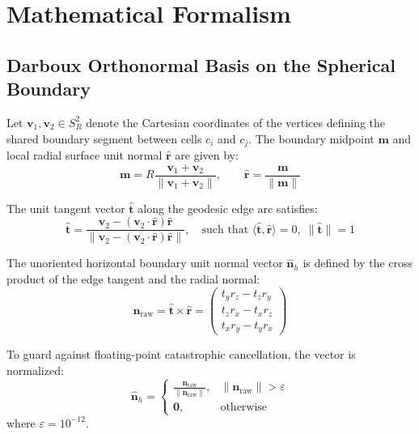 \documentclass[11pt,a4paper]{article}
\begin{document}
\section{Mathematical Formalism}

\subsection{Darboux Orthonormal Basis on the Spherical Boundary}
Let $\mathbf{v}_1, \mathbf{v}_2 \in S^2_R$ denote the Cartesian coordinates of the vertices defining the shared boundary segment between cells $c_i$ and $c_j$. The boundary midpoint $\mathbf{m}$ and local radial surface unit normal $\hat{\mathbf{r}}$ are given by:
\begin{equation}
\mathbf{m} = R \frac{\mathbf{v}_1 + \mathbf{v}_2}{\|\mathbf{v}_1 + \mathbf{v}_2\|}, \qquad \hat{\mathbf{r}} = \frac{\mathbf{m}}{\|\mathbf{m}\|}
\end{equation}

The unit tangent vector $\hat{\mathbf{t}}$ along the geodesic edge arc satisfies:
\begin{equation}
\hat{\mathbf{t}} = \frac{\mathbf{v}_2 - (\mathbf{v}_2 \cdot \hat{\mathbf{r}})\hat{\mathbf{r}}}{\|\mathbf{v}_2 - (\mathbf{v}_2 \cdot \hat{\mathbf{r}})\hat{\mathbf{r}}\|}, \quad \text{such that } \langle \hat{\mathbf{t}}, \hat{\mathbf{r}} \rangle = 0, \; \|\hat{\mathbf{t}}\| = 1
\end{equation}

The unoriented horizontal boundary unit normal vector $\hat{\mathbf{n}}_h$ is defined by the cross product of the edge tangent and the radial normal:
\begin{equation}
\mathbf{n}_{\text{raw}} = \hat{\mathbf{t}} \times \hat{\mathbf{r}} = \begin{pmatrix}
t_y r_z - t_z r_y \\
t_z r_x - t_x r_z \\
t_x r_y - t_y r_x
\end{pmatrix}
\end{equation}

To guard against floating-point catastrophic cancellation, the vector is normalized:
\begin{equation}
\hat{\mathbf{n}}_h = \begin{cases}
\frac{\mathbf{n}_{\text{raw}}}{\|\mathbf{n}_{\text{raw}}\|}, & \|\mathbf{n}_{\text{raw}}\| > \varepsilon \\
\mathbf{0}, & \text{otherwise}
\end{cases}
\end{equation}
where $\varepsilon = 10^{-12}$.
\end{document}
